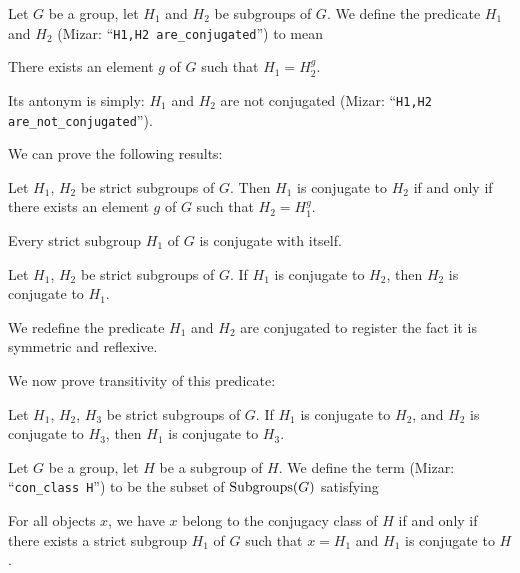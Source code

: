 \documentclass{article}
\begin{document}
\begin{definition}
Let $G$ be a group, let $H_{1}$ and $H_{2}$ be subgroups of $G$.
We define the predicate $H_{1}$ and $H_{2}$ 
(Mizar: ``\verb#H1,H2 are_conjugated#'') to mean
\begin{defn}
\item There exists an element $g$ of $G$ such that $H_{1}=H_{2}^{g}$.
\end{defn}
Its antonym is simply: $H_{1}$ and $H_{2}$ are not conjugated (Mizar:
``\verb#H1,H2 are_not_conjugated#'').
\end{definition}

We can prove the following results:
\begin{thm}
\item\label{group3:102} Let $H_{1}$, $H_{2}$ be strict subgroups of $G$.
  Then $H_{1}$ is conjugate to $H_{2}$ if and only if there exists an
  element $g$ of $G$ such that $H_{2}=H_{1}^{g}$.
\item\label{group3:103} Every strict subgroup $H_{1}$ of $G$ is
  conjugate with itself.
\item\label{group3:104} Let $H_{1}$, $H_{2}$ be strict subgroups of $G$.
  If $H_{1}$ is conjugate to $H_{2}$, then $H_{2}$ is conjugate to $H_{1}$.
\end{thm}

\begin{definition}
We redefine the predicate $H_{1}$ and $H_{2}$ are conjugated to register
the fact it is symmetric and reflexive.
\end{definition}

We now prove transitivity of this predicate:
\begin{thm}
\item\label{group3:105} Let $H_{1}$, $H_{2}$, $H_{3}$ be strict
  subgroups of $G$. If $H_{1}$ is conjugate to $H_{2}$, and $H_{2}$ is
  conjugate to $H_{3}$, then $H_{1}$ is conjugate to $H_{3}$.
\end{thm}

\begin{definition}
Let $G$ be a group, let $H$ be a subgroup of $H$. We define the term
 (Mizar: ``\verb#con_class H#'') to be
the subset of $\operatorname{Subgroups}(G)$ satisfying
\begin{defn}
\item For all objects $x$, we have $x$ belong to the conjugacy class of
  $H$ if and only if there exists a strict subgroup $H_{1}$ of $G$ such
  that $x=H_{1}$ and $H_{1}$ is conjugate to $H$.
\end{defn}
\end{definition}
\end{document}
